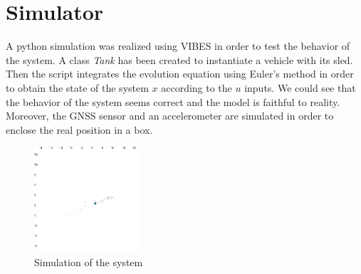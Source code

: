 \section*{Simulator}
    A python simulation was realized using VIBES in order to test the behavior of the system. A class \textit{Tank} has been created to instantiate a vehicle with its sled. Then the script integrates the evolution equation using Euler's method in order to obtain the state of the system $x$ according to the $u$ inputs. We could see that the behavior of the system seems correct and the model is faithful to reality. Moreover, the GNSS sensor and an accelerometer are simulated in order to enclose the real position in a box.

    \begin{figure}[!htb]
        \centering
        \includegraphics[width=0.35\textwidth]{imgs/simulator.png}
        \caption{\label{fig:simulation} Simulation of the system}
    \end{figure}